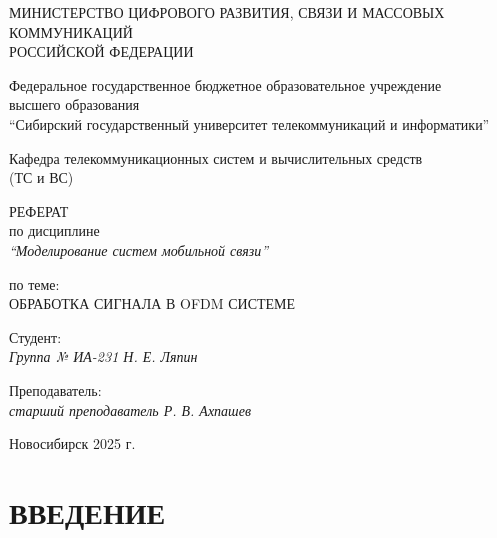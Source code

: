 \documentclass[a4paper,14pt,oneside,openany]{memoir}
\begin{document}
	
	\thispagestyle{empty}
	
	\begin{center}
		МИНИСТЕРСТВО ЦИФРОВОГО РАЗВИТИЯ, СВЯЗИ И МАССОВЫХ КОММУНИКАЦИЙ \\ РОССИЙСКОЙ ФЕДЕРАЦИИ
		
		\vspace{20pt}
		
		Федеральное государственное бюджетное образовательное учреждение  \\  высшего образования \\
		``Сибирский государственный университет телекоммуникаций и информатики'' \\
		
		\vspace{20pt}
		
		Кафедра телекоммуникационных систем и вычислительных средств \\  (ТС и ВС)
	\end{center}
	
	\vfill
	
	\begin{center}
		РЕФЕРАТ \\  
		по дисциплине \\
		\textit{``Моделирование систем мобильной связи''}
		
		\vspace{20pt}
		
		по теме: \\
		\uppercase{Обработка сигнала в OFDM системе}
	\end{center}
	
	\vfill
	
	\noindent Студент: \\
	\textit{Группа № ИА-231 \hfill Н. Е. Ляпин}
	
	\vspace{20pt}
	
	\noindent Преподаватель: \\
	\textit{старший преподаватель \hfill Р. В. Ахпашев}
	
	\vfill
	
	\begin{center}
		Новосибирск 2025 г.
	\end{center}
	
	\newpage
	\setcounter{page}{2}
	\OnehalfSpacing*
	
	\tableofcontents*
	
	\chapter*{ВВЕДЕНИЕ}
	
\end{document}
